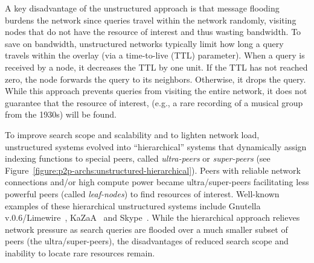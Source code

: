 A key disadvantage of the unstructured approach is that message flooding burdens
the network since queries travel within the network randomly, visiting nodes
that do not have the resource of interest and thus wasting bandwidth.  To save
on bandwidth, unstructured networks typically limit how long a query travels
within the overlay (via a time-to-live (TTL) parameter). When a query is
received by a node, it decreases the TTL by one unit. If the TTL has not reached
zero, the node forwards the query to its neighbors.  Otherwise, it drops the
query. While this approach prevents queries from visiting the entire network, it
does not guarantee that the resource of interest, (e.g., a rare recording 
of a musical group from the 1930s) will be found.

To improve search scope and scalability and to lighten network load, 
unstructured systems evolved into ``hierarchical'' systems that dynamically
assign indexing functions to special peers, called \emph{ultra-peers}  or
\emph{super-peers} (see
Figure~\ref{figure:p2p-archs:unstructured-hierarchical}). Peers with reliable
network connections and/or high compute power became ultra/super-peers
facilitating less powerful peers (called \emph{leaf-nodes}) to find resources of
interest. Well-known examples of these hierarchical unstructured systems include
Gnutella v.0.6/Limewire~\cite{gnutella}, KaZaA~\cite{kazaa} and
Skype~\cite{skype}. While the hierarchical approach relieves network pressure as
search queries are flooded over a much smaller subset of peers (the
ultra/super-peers), the disadvantages of reduced search scope and inability to
locate rare resources remain.

